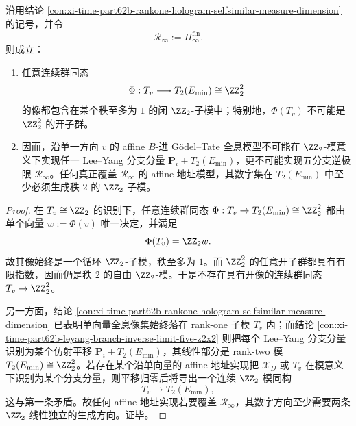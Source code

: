 \begin{conclusion}\label{con:xi-time-part62b-rankone-hologram-leyang-rank-obstruction}
沿用结论 \ref{con:xi-time-part62b-rankone-hologram-selfsimilar-measure-dimension} 的记号，并令
\[
\mathcal R_\infty:=\Pi_\infty^{\mathrm{fin}}.
\]
则成立：
\begin{enumerate}
  \item 任意连续群同态
  \[
  \Phi:T_v\longrightarrow T_2(E_{\min})\cong \ZZ_2^2
  \]
  的像都包含在某个秩至多为 \(1\) 的闭 \(\ZZ_2\)-子模中；特别地，\(\Phi(T_v)\) 不可能是 \(\ZZ_2^2\) 的开子群。
  \item 因而，沿单一方向 \(v\) 的 affine \(B\)-进 Gödel--Tate 全息模型不可能在 \(\ZZ_2\)-模意义下实现任一 Lee--Yang 分支分量 \(\mathbf P_i+T_2(E_{\min})\)，更不可能实现五分支逆极限 \(\mathcal R_\infty\)。任何真正覆盖 \(\mathcal R_\infty\) 的 affine 地址模型，其数字集在 \(T_2(E_{\min})\) 中至少必须生成秩 \(2\) 的 \(\ZZ_2\)-子模。
\end{enumerate}
\end{conclusion}
\begin{proof}
在 \(T_v\cong \ZZ_2\) 的识别下，任意连续群同态 \(\Phi:T_v\to T_2(E_{\min})\cong \ZZ_2^2\) 都由单个向量 \(w:=\Phi(v)\) 唯一决定，并满足
\[
\Phi(T_v)=\ZZ_2 w.
\]
故其像始终是一个循环 \(\ZZ_2\)-子模，秩至多为 \(1\)。而 \(\ZZ_2^2\) 的任意开子群都具有有限指数，因而仍是秩 \(2\) 的自由 \(\ZZ_2\)-模。于是不存在具有开像的连续群同态 \(T_v\to \ZZ_2^2\)。

另一方面，结论 \ref{con:xi-time-part62b-rankone-hologram-selfsimilar-measure-dimension} 已表明单向量全息像集始终落在 rank-one 子模 \(T_v\) 内；而结论 \ref{con:xi-time-part62b-leyang-branch-inverse-limit-five-z2x2} 则把每个 Lee--Yang 分支分量识别为某个仿射平移 \(\mathbf P_i+T_2(E_{\min})\)，其线性部分是 rank-two 模 \(T_2(E_{\min})\cong \ZZ_2^2\)。若存在某个沿单向量的 affine 地址实现把 \(\mathcal X_D\) 或 \(T_v\) 在模意义下识别为某个分支分量，则平移归零后将导出一个连续 \(\ZZ_2\)-模同构
\[
T_v\longrightarrow T_2(E_{\min}),
\]
这与第一条矛盾。故任何 affine 地址实现若要覆盖 \(\mathcal R_\infty\)，其数字方向至少需要两条 \(\ZZ_2\)-线性独立的生成方向。证毕。
\end{proof}

